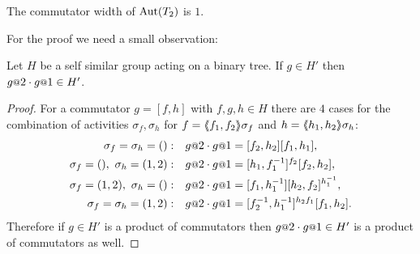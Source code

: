 \documentclass[a4paper,11pt]{amsart}
\begin{document}
\begin{pro}\label{pro:comwidthAutT2}
 The commutator width of $\operatorname{{Aut}}(T_2)$ is $1$.
\end{pro}
For the proof we need a small observation:
\begin{lem}\label{lem:H'}
  Let $H$ be a self similar group acting on a binary tree.
  If $g\in H'$ then $g\at{2}\cdot g\at{1}\in H'$. 
\end{lem}
\begin{proof}
 For a commutator $g=[f,h]$ with $f,g,h\in H$ there are $4$ cases for the combination
 of activities $\sigma_f,\sigma_h$ for $f=\langle\negthickspace\langle f_1,f_2\rangle\negthickspace\rangle\sigma_f$ and $h=\langle\negthickspace\langle h_1,h_2\rangle\negthickspace\rangle\sigma_h$:
 \begin{align*}
  \sigma_f=\sigma_h=()&: & g\at{2}\cdot g\at{1} &= [f_2,h_2][f_1,h_1], \\
  \sigma_f=(),\ \sigma_h=(1,2)&: & g\at{2}\cdot g\at{1} &= [h_1,f_1^{-1}]^{f_2}[f_2,h_2], \\
  \sigma_f=(1,2),\ \sigma_h=()&: & g\at{2}\cdot g\at{1} &= [f_1,h_1^{-1}][h_2,f_2]^{h_1^{-1}}, \\
  \sigma_f=\sigma_h=(1,2)&: & g\at{2}\cdot g\at{1} &= [f_2^{-1},h_1^{-1}]^{h_2f_1}[f_1,h_2].
 \end{align*}
 Therefore if $g\in H'$ is a product of commutators then $g\at{2}\cdot g\at{1}\in H'$ is a product
 of commutators as well.
\end{proof}

%  
\end{document}
